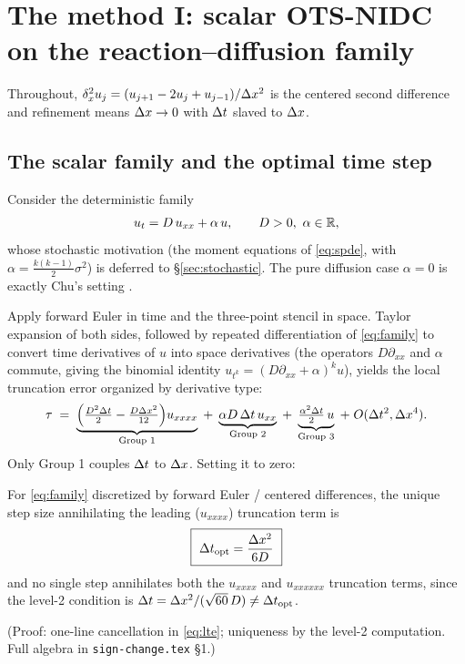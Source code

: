\section{The method I: scalar OTS-NIDC on the reaction--diffusion family}
\label{sec:method}

Throughout, $\delta_x^2 u_j = (u_{j+1}-2u_j+u_{j-1})/\Delta x^2$ is the centered second
difference and refinement means $\Delta x\to0$ with $\Delta t$ slaved to $\Delta x$.

\subsection{The scalar family and the optimal time step}

Consider the deterministic family
\begin{equation}\label{eq:family}
u_t = D\,u_{xx} + \alpha\,u, \qquad D>0,\ \alpha\in\mathbb{R},
\end{equation}
whose stochastic motivation (the moment equations of \eqref{eq:spde}, with
$\alpha = \frac{k(k-1)}2\sigma^2$) is deferred to \S\ref{sec:stochastic}.
The pure diffusion case $\alpha=0$ is exactly Chu's setting \citep{chu2011}.

Apply forward Euler in time and the three-point stencil in space. Taylor
expansion of both sides, followed by repeated differentiation of
\eqref{eq:family} to convert time derivatives of $u$ into space derivatives
(the operators $D\partial_{xx}$ and $\alpha$ commute, giving the binomial
identity $u_{t^k} = (D\partial_{xx}+\alpha)^k u$), yields the local truncation
error organized by derivative type:
\begin{equation}\label{eq:lte}
\tau \;=\;
\underbrace{\Bigl(\tfrac{D^2\Delta t}2 - \tfrac{D\Delta x^2}{12}\Bigr)u_{xxxx}}_{\text{Group 1}}
\;+\;
\underbrace{\alpha D\,\Delta t\,u_{xx}}_{\text{Group 2}}
\;+\;
\underbrace{\tfrac{\alpha^2\Delta t}2\,u}_{\text{Group 3}}
\;+\;O(\Delta t^2,\Delta x^4).
\end{equation}
Only Group 1 couples $\Delta t$ to $\Delta x$. Setting it to zero:

\begin{theorem}\label{thm:ots}
For \eqref{eq:family} discretized by forward Euler / centered differences, the
unique step size annihilating the leading ($u_{xxxx}$) truncation term is
\begin{equation}\label{eq:dtopt2}
\boxed{\ \Delta t_{\mathrm{opt}} = \frac{\Delta x^2}{6D}\ }
\end{equation}
and no single step annihilates both the $u_{xxxx}$ and $u_{xxxxxx}$ truncation
terms, since the level-2 condition is $\Delta t = \Delta x^2/(\sqrt{60}\,D) \ne \Delta t_{\mathrm{opt}}$.
\end{theorem}
\noindent (Proof: one-line cancellation in \eqref{eq:lte}; uniqueness by the
level-2 computation. Full algebra in \texttt{sign-change.tex} \S1.)


